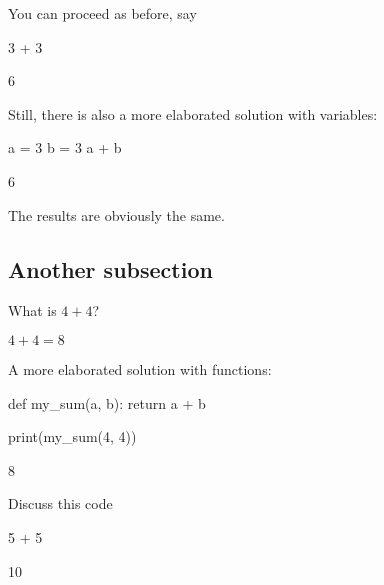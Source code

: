 \documentclass{book}
\begin{document}
\begin{additionalinformation}
You can proceed as before, say
\begin{pycell}
3 + 3
\end{pycell}
\begin{pyexpectedoutput}
6
\end{pyexpectedoutput}

\newpage

Still, there is also a more elaborated solution with variables:

\begin{pycell}
a = 3
b = 3
a + b
\end{pycell}
\begin{pyexpectedoutput}
6
\end{pyexpectedoutput}

The results are obviously the same.
\end{additionalinformation}

\subsection{Another subsection}

\begin{exercise}
  What is \(4 + 4\)?
\end{exercise}

\begin{solution}
  \(4 + 4 = 8\)
\end{solution}

\begin{additionalinformation}
A more elaborated solution with functions:

\begin{pycell}
def my_sum(a, b):
    return a + b

print(my_sum(4, 4))
\end{pycell}
\begin{pyexpectedoutput}
8
\end{pyexpectedoutput}
\end{additionalinformation}

\begin{exercise}
Discuss this code

\begin{pycell}
5 + 5
\end{pycell}
\begin{pyexpectedoutput}
10
\end{pyexpectedoutput}
\end{exercise}
\end{document}
